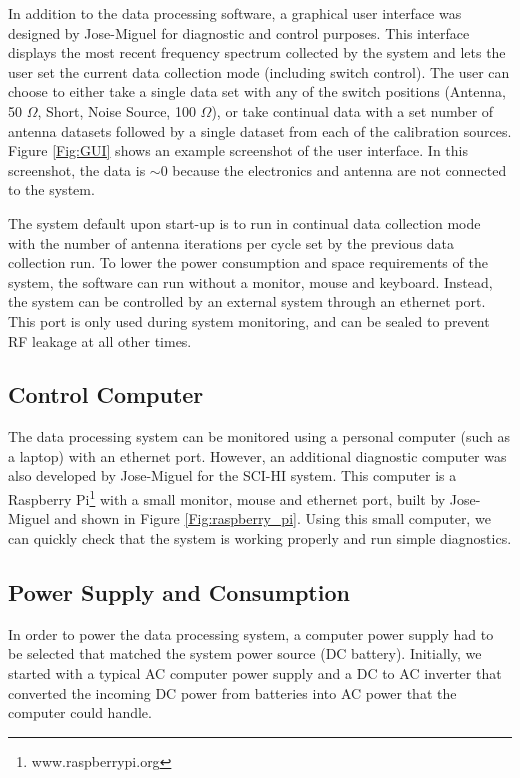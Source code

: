 In addition to the data processing software, a graphical user interface was designed by Jose-Miguel for diagnostic and control purposes. This interface displays the most recent frequency spectrum collected by the system and lets the user set the current data collection mode (including switch control). The user can choose to either take a single data set with any of the switch positions (Antenna, 50 $\Omega$, Short, Noise Source, 100 $\Omega$), or take continual data with a set number of antenna datasets followed by a single dataset from each of the calibration sources. Figure \ref{Fig:GUI} shows an example screenshot of the user interface. In this screenshot, the data is $\sim0$ because the electronics and antenna are not connected to the system. 

The system default upon start-up is to run in continual data collection mode with the number of antenna iterations per cycle set by the previous data collection run. To lower the power consumption and space requirements of the system, the software can run without a monitor, mouse and keyboard. Instead, the system can be controlled by an external system through an ethernet port. This port is only used during system monitoring, and can be sealed to prevent RF leakage at all other times. 


\subsection{Control Computer}

The data processing system can be monitored using a personal computer (such as a laptop) with an ethernet port. However, an additional diagnostic computer was also developed by Jose-Miguel for the SCI-HI system. This computer is a Raspberry Pi\footnote{www.raspberrypi.org} with a small monitor, mouse and ethernet port, built by Jose-Miguel and shown in Figure \ref{Fig:raspberry_pi}. Using this small computer, we can quickly check that the system is working properly and run simple diagnostics.

\subsection{Power Supply and Consumption}
In order to power the data processing system, a computer power supply had to be selected that matched the system power source (DC battery). Initially, we started with a typical AC computer power supply and a DC to AC inverter that converted the incoming DC power from batteries into AC power that the computer could handle. 

